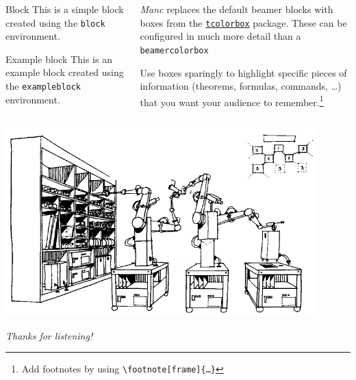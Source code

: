 \documentclass[compress,aspectratio=1610]{beamer}
\begin{document}
\begin{frame}[fragile]
  \begin{columns}
    \begin{column}{0.5\textwidth}
      \begin{block}{Block}
        This is a simple block created using the \texttt{block} environment.
      \end{block}
      \begin{exampleblock}{Example block}
        This is an example block created using the \texttt{exampleblock} environment.
      \end{exampleblock}
    \end{column}
    \begin{column}{0.5\textwidth}
      \emph{Manc} replaces the default beamer blocks with boxes from the \href{https://www.ctan.org/pkg/tcolorbox}{\texttt{tcolorbox}} package.
      These can be configured in much more detail than a \texttt{beamercolorbox}
      \medskip

      Use boxes sparingly to highlight specific pieces of information (theorems, formulas, commands, …) that you want your audience to remember.\footnote[frame]{Add footnotes by using \texttt{\backslash footnote[frame]\{…\}}}
    \end{column}
  \end{columns}
\end{frame}

\begin{frame}
  \centering
  \includegraphics[width=0.9\textwidth]{./graphics/self-replicating.png}
\end{frame}

\begin{darkframe}[noframenumbering]
  \centering
  \textit{Thanks for listening!}
\end{darkframe}

\end{document}
